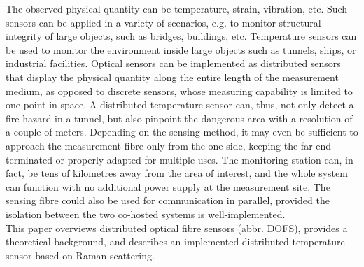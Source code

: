 \documentclass{standalone}
\begin{document}
The observed physical quantity can be temperature, strain, vibration, etc. Such sensors can be applied in a variety of scenarios, e.g. to monitor structural integrity of large objects, such as bridges, buildings, etc. Temperature sensors can be used to monitor the environment inside large objects such as tunnels, ships, or industrial facilities. Optical sensors can be implemented as distributed sensors that display the physical quantity along the entire length of the measurement medium, as opposed to discrete sensors, whose measuring capability is limited to one point in space. A distributed temperature sensor can, thus, not only detect a fire hazard in a tunnel, but also pinpoint the dangerous area with a resolution of a couple of meters. Depending on the sensing method, it may even be sufficient to approach the measurement fibre only from the one side, keeping the far end terminated or properly adapted for multiple uses. The monitoring station can, in fact, be tens of kilometres away from the area of interest, and the whole system can function with no additional power supply at the measurement site. The sensing fibre could also be used for communication in parallel, provided the isolation between the two co-hosted systems is well-implemented. \\

This paper overviews distributed optical fibre sensors (abbr. DOFS), provides a theoretical background, and describes an implemented distributed temperature sensor based on Raman scattering. 



\setcounter{stranica}{\thepage}
\addtocounter{stranica}{1}
\end{document}
